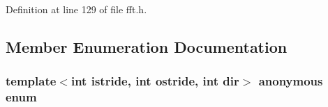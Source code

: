 Definition at line 129 of file fft.\+h.



\subsection{Member Enumeration Documentation}
\subsubsection[{\texorpdfstring{anonymous enum}{anonymous enum}}]{\setlength{\rightskip}{0pt plus 5cm}template$<$int istride, int ostride, int dir$>$ anonymous enum}\hypertarget{class__sbsms___1_1____fft_3_01istride_00_01ostride_00_015_00_01dir_01_4_a007212447733f8e87c12b1d71b962d28}{}\label{class__sbsms___1_1____fft_3_01istride_00_01ostride_00_015_00_01dir_01_4_a007212447733f8e87c12b1d71b962d28}
